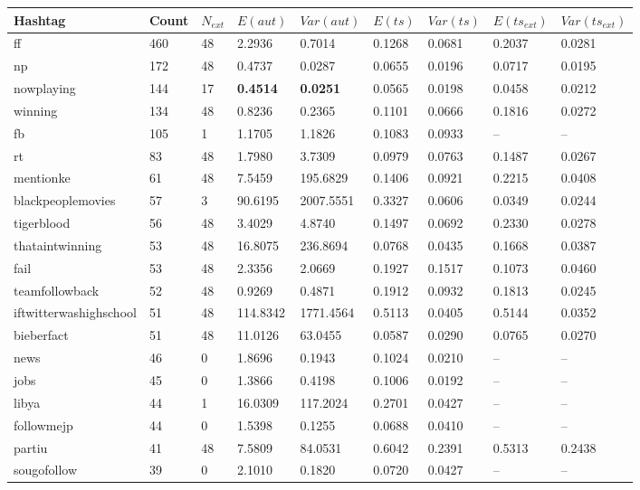 \documentclass{llncs}
\begin{document}
\begin{table}[ht*]
\centering
\begin{tabular}{ l|l|l|l|l|l|l|l|l }
Hashtag & Count & $N_{ext}$ & $E(aut)$ & $Var(aut)$ & $E(ts)$ & $Var(ts)$ & $E(ts_{ext})$ & $Var(ts_{ext})$\\
\hline
ff &     460 & 48 & 2.2936 & 0.7014 & 0.1268 & 0.0681 & 0.2037 & 0.0281 \\
np &     172 & 48 & 0.4737 & 0.0287 & 0.0655 & 0.0196 & 0.0717 & 0.0195\\
nowplaying & 144 & 17 & \textbf{0.4514} & \textbf{0.0251} & 0.0565 & 0.0198 & 0.0458 & 0.0212 \\
winning &     134 & 48 & 0.8236 & 0.2365 & 0.1101 & 0.0666 & 0.1816 & 0.0272 \\
fb & 105 & 1 & 1.1705 & 1.1826 & 0.1083 & 0.0933 & -- & -- \\
rt & 83 & 48 & 1.7980 & 3.7309 & 0.0979 & 0.0763 & 0.1487 & 0.0267 \\
mentionke & 61 & 48 & 7.5459 & 195.6829 & 0.1406 & 0.0921 & 0.2215 & 0.0408 \\
blackpeoplemovies & 57 & 3 & 90.6195 & 2007.5551 & 0.3327 & 0.0606 & 0.0349 & 0.0244\\
tigerblood & 56 & 48 & 3.4029 & 4.8740 & 0.1497 & 0.0692 & 0.2330 & 0.0278 \\
thataintwinning & 53 & 48 & 16.8075 & 236.8694 & 0.0768 & 0.0435 & 0.1668 & 0.0387 \\
fail & 53 & 48 & 2.3356 & 2.0669 & 0.1927 & 0.1517 & 0.1073 & 0.0460 \\
teamfollowback & 52 & 48 & 0.9269 & 0.4871 & 0.1912 & 0.0932 & 0.1813 & 0.0245 \\
iftwitterwashighschool & 51 & 48 & 114.8342 & 1771.4564 & 0.5113 & 0.0405 & 0.5144 & 0.0352 \\
bieberfact & 51 & 48 & 11.0126 & 63.0455 & 0.0587 & 0.0290 & 0.0765 & 0.0270 \\
news & 46 & 0 & 1.8696 & 0.1943 & 0.1024 & 0.0210 & -- & --  \\
jobs & 45 & 0 & 1.3866 & 0.4198 & 0.1006 & 0.0192 & -- & -- \\
libya & 44 & 1 & 16.0309 & 117.2024 & 0.2701 & 0.0427 & -- & -- \\
followmejp & 44 & 0	& 1.5398 & 0.1255 & 0.0688 & 0.0410 & -- & --\\
partiu & 41 & 48 & 7.5809 & 84.0531 & 0.6042 & 0.2391 & 0.5313 & 0.2438 \\
sougofollow & 39 & 0 & 2.1010 & 0.1820 & 0.0720 & 0.0427 & -- & -- \\

\end{tabular}
\end{table}
\end{document}
